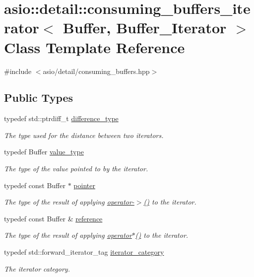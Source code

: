 \hypertarget{classasio_1_1detail_1_1consuming__buffers__iterator}{}\section{asio\+:\+:detail\+:\+:consuming\+\_\+buffers\+\_\+iterator$<$ Buffer, Buffer\+\_\+\+Iterator $>$ Class Template Reference}
\label{classasio_1_1detail_1_1consuming__buffers__iterator}


{\ttfamily \#include $<$asio/detail/consuming\+\_\+buffers.\+hpp$>$}

\subsection*{Public Types}
\begin{DoxyCompactItemize}
\item 
typedef std\+::ptrdiff\+\_\+t \hyperlink{classasio_1_1detail_1_1consuming__buffers__iterator_ae0f3c33c5ca70ab6fb129299f6092b78}{difference\+\_\+type}
\begin{DoxyCompactList}\small\item\em The type used for the distance between two iterators. \end{DoxyCompactList}\item 
typedef Buffer \hyperlink{classasio_1_1detail_1_1consuming__buffers__iterator_a2462f38aaa732fe3694cae9d8896ee7e}{value\+\_\+type}
\begin{DoxyCompactList}\small\item\em The type of the value pointed to by the iterator. \end{DoxyCompactList}\item 
typedef const Buffer $\ast$ \hyperlink{classasio_1_1detail_1_1consuming__buffers__iterator_ae79f642abeaf9c9cd33a326a1cf00293}{pointer}
\begin{DoxyCompactList}\small\item\em The type of the result of applying \hyperlink{classasio_1_1detail_1_1consuming__buffers__iterator_a2eaf29938b709e047a7d77ce79113a59}{operator-\/$>$()} to the iterator. \end{DoxyCompactList}\item 
typedef const Buffer \& \hyperlink{classasio_1_1detail_1_1consuming__buffers__iterator_afb896cbf35f476cb828083b5439d0991}{reference}
\begin{DoxyCompactList}\small\item\em The type of the result of applying \hyperlink{classasio_1_1detail_1_1consuming__buffers__iterator_a2ab29aa14557ac04a71b1f5015a06c0d}{operator$\ast$()} to the iterator. \end{DoxyCompactList}\item 
typedef std\+::forward\+\_\+iterator\+\_\+tag \hyperlink{classasio_1_1detail_1_1consuming__buffers__iterator_a23bcf111a9ac4efe9ce2daebd4bd11c9}{iterator\+\_\+category}
\begin{DoxyCompactList}\small\item\em The iterator category. \end{DoxyCompactList}\end{DoxyCompactItemize}
